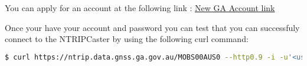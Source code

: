 You can apply for an account at the following link : \href{https://gnss-users-prod.auth.ap-southeast-2.amazoncognito.com/login?response_type=code&client_id=11njl767q0tl1faf9qna469vl1&redirect_uri=https://search-gnss-elasticsearch-prod-5omhch5quzlu5dcpbct4ev5qz4.ap-southeast-2.es.amazonaws.com/_plugin/kibana/app/kibana&state=e36b2054-7ace-4931-91a3-5ba6de893917}{New GA Account link}

Once your have your account and password you can test that you can successfuly connect to the NTRIPCaster by using the following curl command:
\begin{lstlisting}[language=bash]
$ curl https://ntrip.data.gnss.ga.gov.au/MOBS00AUS0 --http0.9 -i -u'<username>:<password> --output -'
\end{lstlisting}

